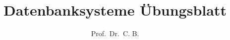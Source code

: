 


\subject{Vorlesung aus dem WS21/22}
\title{Datenbanksysteme \"Ubungsblatt}
\author{Prof. \,Dr.~C. B.}%
\date{}
\publishers{\small ge{\TeX}t von Ningh}
\maketitle
\thispagestyle{empty}
\tableofcontents
\clearpage



% 
% 
% 
% 





